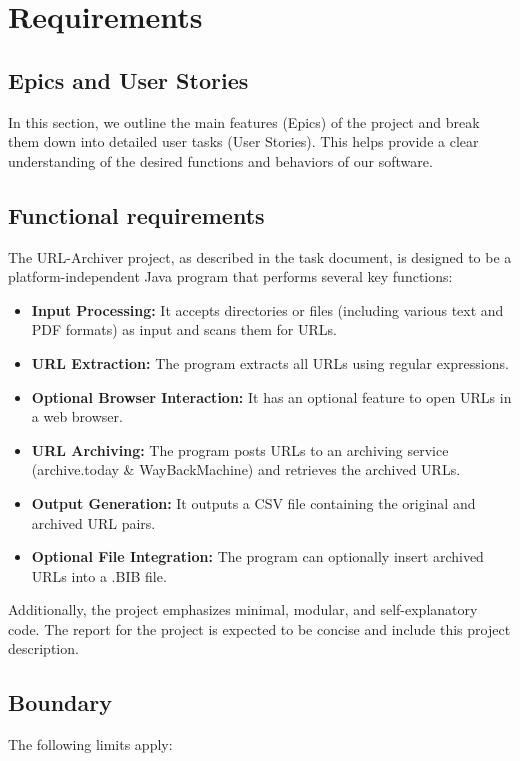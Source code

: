 \section{Requirements}

\subsection{Epics and User Stories}
In this section, we outline the main features (Epics) of the project and break them down into detailed user tasks (User Stories). This helps provide a clear understanding of the desired functions and behaviors of our software.





\clearpage
\subsection{Functional requirements}
The URL-Archiver project, as described in the task document, is designed to be a platform-independent Java program that performs several key functions:

\begin{itemize}
    \item \textbf{Input Processing:} It accepts directories or files (including various text and PDF formats) as input and scans them for URLs.
    \item \textbf{URL Extraction:} The program extracts all URLs using regular expressions.
    \item \textbf{Optional Browser Interaction:} It has an optional feature to open URLs in a web browser.
    \item \textbf{URL Archiving:} The program posts URLs to an archiving service (archive.today \& WayBackMachine) and retrieves the archived URLs.
    \item \textbf{Output Generation:} It outputs a CSV file containing the original and archived URL pairs.
    \item \textbf{Optional File Integration:} The program can optionally insert archived URLs into a .BIB file.
\end{itemize}

Additionally, the project emphasizes minimal, modular, and self-explanatory code. The report for the project is expected to be concise and include this project description.

\subsection{Boundary}
The following limits apply:

